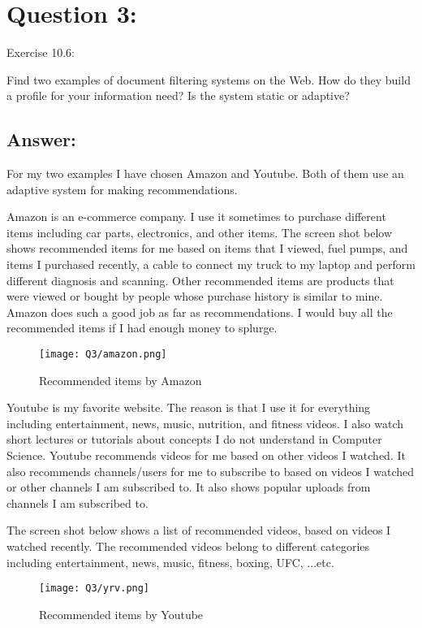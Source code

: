 \section*{Question 3:}
Exercise 10.6: 

Find two examples of document filtering systems on the Web. How do they build a profile for your information need? Is the system static or adaptive?


\subsection*{Answer:}

For my two examples I have chosen Amazon and Youtube. Both of them use an adaptive system for making recommendations. 

Amazon is an e-commerce company. I use it sometimes to purchase different items including car parts, electronics, and other items. The screen shot below shows recommended items for me based on items that I viewed, fuel pumps, and items I purchased recently, a cable to connect my truck to my laptop and perform different diagnosis and scanning. Other recommended items are products that were viewed or bought by people whose purchase history is similar to mine. Amazon does such a good job as far as recommendations. I would buy all the recommended items if I had enough money to splurge. 

\begin{figure}[h]
\caption{Recommended items by Amazon}
\centering
\texttt{[image: Q3/amazon.png]}
\end{figure}

\pagebreak

Youtube is my favorite website. The reason is that I use it for everything including entertainment, news, music, nutrition, and fitness videos. I also watch short lectures or tutorials about concepts I do not understand in Computer Science. Youtube recommends videos for me based on other videos I watched. It also recommends channels/users for me to subscribe to based on videos I watched or other channels I am subscribed to. It also shows popular uploads from channels I am subscribed to.

The screen shot below shows a list of recommended videos, based on videos I watched recently. The recommended videos belong to different categories including entertainment, news, music, fitness, boxing, UFC, ...etc.

\begin{figure}[h]
\caption{Recommended items by Youtube}
\centering
\texttt{[image: Q3/yrv.png]}
\end{figure}

